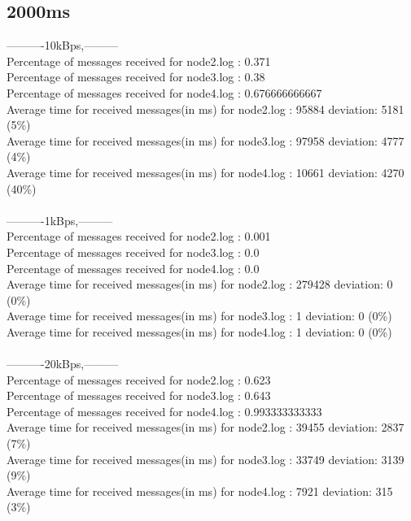     \subsection{2000ms}\label{RawResults:2000ms}
        ----------10kBps,---------\\
        Percentage of messages received for node2.log : 0.371\\
        Percentage of messages received for node3.log : 0.38\\
        Percentage of messages received for node4.log : 0.676666666667\\
        Average time for received messages(in ms) for  node2.log : 95884 	deviation: 5181 (5\%)\\
        Average time for received messages(in ms) for  node3.log : 97958 	deviation: 4777 (4\%)\\
        Average time for received messages(in ms) for  node4.log : 10661 	deviation: 4270 (40\%)\\\\
        ----------1kBps,---------\\
        Percentage of messages received for node2.log : 0.001\\
        Percentage of messages received for node3.log : 0.0\\
        Percentage of messages received for node4.log : 0.0\\
        Average time for received messages(in ms) for  node2.log : 279428 	deviation: 0 (0\%)\\
        Average time for received messages(in ms) for  node3.log : 1 	deviation: 0 (0\%)\\
        Average time for received messages(in ms) for  node4.log : 1 	deviation: 0 (0\%)\\\\
        ----------20kBps,---------\\
        Percentage of messages received for node2.log : 0.623\\
        Percentage of messages received for node3.log : 0.643\\
        Percentage of messages received for node4.log : 0.993333333333\\
        Average time for received messages(in ms) for  node2.log : 39455 	deviation: 2837 (7\%)\\
        Average time for received messages(in ms) for  node3.log : 33749 	deviation: 3139 (9\%)\\
        Average time for received messages(in ms) for  node4.log : 7921 	deviation: 315 (3\%)\\\\
